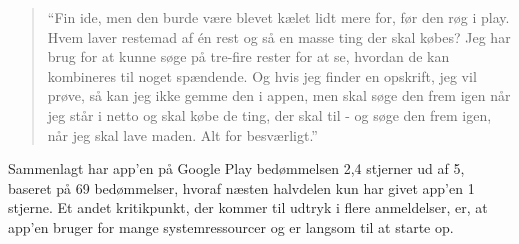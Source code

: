 \begin{quote}
  ``Fin ide, men den burde være blevet kælet lidt mere for, før den røg i play. Hvem laver restemad af én rest og så en masse ting der skal købes? Jeg har brug for at kunne søge på tre-fire rester for at se, hvordan de kan kombineres til noget spændende. Og hvis jeg finder en opskrift, jeg vil prøve, så kan jeg ikke gemme den i appen, men skal søge den frem igen når jeg står i netto og skal købe de ting, der skal til - og søge den frem igen, når jeg skal lave maden. Alt for besværligt.''
\end{quote}

Sammenlagt har app’en på Google Play bedømmelsen 2,4 stjerner ud af 5, baseret på 69 bedømmelser, hvoraf næsten halvdelen kun har givet app’en 1 stjerne. Et andet kritikpunkt, der kommer til udtryk i flere anmeldelser, er, at app’en bruger for mange systemressourcer og er langsom til at starte op.
